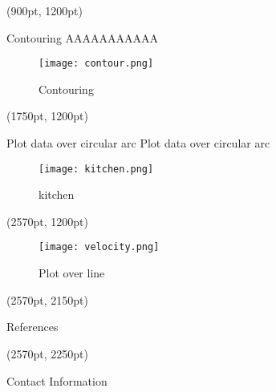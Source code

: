 \documentclass[final]{beamer}
\begin{document}
\begin{frame}
\begin{textblock*}{800pt}(900pt, 1200pt)
\begin{block}{Contouring}
AAAAAAAAAAA

\begin{figure}
\texttt{[image: contour.png]}
\caption{Contouring}
\end{figure}
\end{block}
\end{textblock*}

\begin{textblock*}{800pt}(1750pt, 1200pt)
\begin{block}{Plot data over circular arc}
Plot data over circular arc
\begin{figure}
\texttt{[image: kitchen.png]}
\caption{kitchen}
\end{figure}
\end{block}
\end{textblock*}

\begin{textblock*}{800pt}(2570pt, 1200pt)

\begin{figure}
\texttt{[image: velocity.png]}
\caption{Plot over line}
\end{figure}
\end{textblock*}

\begin{textblock*}{800pt}(2570pt, 2150pt)
\begin{block}{References}
\end{block}
\end{textblock*}

\begin{textblock*}{800pt}(2570pt, 2250pt)
\begin{block}{Contact Information}
\end{block}
\end{textblock*}

\end{frame}
\end{document}
